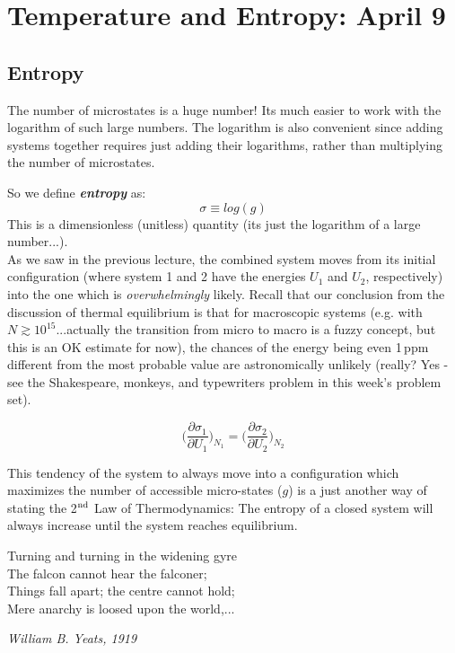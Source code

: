 \section{Temperature and Entropy: April 9}

\subsection{Entropy}
\label{s:Entropy}
The number of microstates is a huge number! Its much easier to work with the
logarithm of such large numbers. The logarithm is also convenient since adding
systems together requires just adding their logarithms, rather than multiplying
the number of microstates.

So we define \textit{\textbf{entropy}} as:
\begin{equation}
\sigma \equiv log(g)
\end{equation}
This is a dimensionless (unitless) quantity (its just the logarithm 
of a large number...). \\

As we saw in the previous lecture, the combined system moves from its initial configuration
(where system 1 and 2 have the energies $U_1$ and $U_2$, respectively) into the one which
is \emph{overwhelmingly} likely. Recall that our conclusion from the discussion of thermal
equilibrium is that for macroscopic systems (e.g. with $N \gtrsim 10^{15}$...actually the
transition from micro to macro is a fuzzy concept, but this is an OK estimate for now), the
chances of the energy being even 1\,ppm different from the most probable value are astronomically unlikely (really? Yes - see the Shakespeare, monkeys, and typewriters
problem in this week's problem set).

\begin{equation}
\bigg(\frac{\partial \sigma_1}{\partial U_1}\bigg)_{N_1} = 
\bigg(\frac{\partial \sigma_2}{\partial U_2}\bigg)_{N_2}
\label{eq:Teq}
\end{equation}

This tendency of the system to always move into a configuration which maximizes
the number of accessible micro-states ($g$) is a just another way of stating the
2$^{\rm nd}$ Law of Thermodynamics: The entropy of a closed system will always 
increase until the system reaches equilibrium.

\epigraph{Turning and turning in the widening gyre \\
The falcon cannot hear the falconer; \\
Things fall apart; the centre cannot hold; \\
Mere anarchy is loosed upon the world,...}{\textit{William B. Yeats, 1919}}


